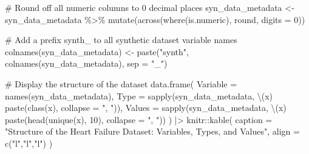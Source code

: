 \documentclass[
  letterpaper,
  DIV=11,
  numbers=noendperiod]{scrartcl}
\newenvironment{Shaded}{\begin{snugshade}}{\end{snugshade}}
\newcommand{\AttributeTok}[1]{\textcolor[rgb]{0.40,0.45,0.13}{#1}}
\newcommand{\CommentTok}[1]{\textcolor[rgb]{0.37,0.37,0.37}{#1}}
\newcommand{\DecValTok}[1]{\textcolor[rgb]{0.68,0.00,0.00}{#1}}
\newcommand{\FunctionTok}[1]{\textcolor[rgb]{0.28,0.35,0.67}{#1}}
\newcommand{\NormalTok}[1]{\textcolor[rgb]{0.00,0.23,0.31}{#1}}
\newcommand{\OtherTok}[1]{\textcolor[rgb]{0.00,0.23,0.31}{#1}}
\newcommand{\SpecialCharTok}[1]{\textcolor[rgb]{0.37,0.37,0.37}{#1}}
\newcommand{\StringTok}[1]{\textcolor[rgb]{0.13,0.47,0.30}{#1}}
\begin{document}
\begin{Shaded}
\begin{Highlighting}[]
\CommentTok{\# Round off all numeric columns to 0 decimal places}
\NormalTok{syn\_data\_metadata }\OtherTok{\textless{}{-}}\NormalTok{ syn\_data\_metadata }\SpecialCharTok{\%\textgreater{}\%}
  \FunctionTok{mutate}\NormalTok{(}\FunctionTok{across}\NormalTok{(}\FunctionTok{where}\NormalTok{(is.numeric), round, }\AttributeTok{digits =} \DecValTok{0}\NormalTok{))}

\CommentTok{\# Add a prefix \textquotesingle{}synth\_\textquotesingle{} to all synthetic dataset variable names}
\FunctionTok{colnames}\NormalTok{(syn\_data\_metadata) }\OtherTok{\textless{}{-}} \FunctionTok{paste}\NormalTok{(}\StringTok{"synth"}\NormalTok{, }\FunctionTok{colnames}\NormalTok{(syn\_data\_metadata), }\AttributeTok{sep =} \StringTok{"\_"}\NormalTok{)}

\CommentTok{\# Display the structure of the dataset}
\FunctionTok{data.frame}\NormalTok{(}
  \AttributeTok{Variable =} \FunctionTok{names}\NormalTok{(syn\_data\_metadata),}
  \AttributeTok{Type =} \FunctionTok{sapply}\NormalTok{(syn\_data\_metadata, \textbackslash{}(x) }\FunctionTok{paste}\NormalTok{(}\FunctionTok{class}\NormalTok{(x), }\AttributeTok{collapse =} \StringTok{", "}\NormalTok{)),}
  \AttributeTok{Values =} \FunctionTok{sapply}\NormalTok{(syn\_data\_metadata, \textbackslash{}(x) }\FunctionTok{paste}\NormalTok{(}\FunctionTok{head}\NormalTok{(}\FunctionTok{unique}\NormalTok{(x), }\DecValTok{10}\NormalTok{), }\AttributeTok{collapse =} \StringTok{", "}\NormalTok{))}
\NormalTok{) }\SpecialCharTok{|\textgreater{}}
\NormalTok{  knitr}\SpecialCharTok{::}\FunctionTok{kable}\NormalTok{(}
    \AttributeTok{caption =} \StringTok{"Structure of the Heart Failure Dataset: Variables, Types, and Values"}\NormalTok{,}
    \AttributeTok{align =} \FunctionTok{c}\NormalTok{(}\StringTok{"l"}\NormalTok{,}\StringTok{"l"}\NormalTok{,}\StringTok{"l"}\NormalTok{)}
\NormalTok{  )}
\end{Highlighting}
\end{Shaded}
\end{document}
